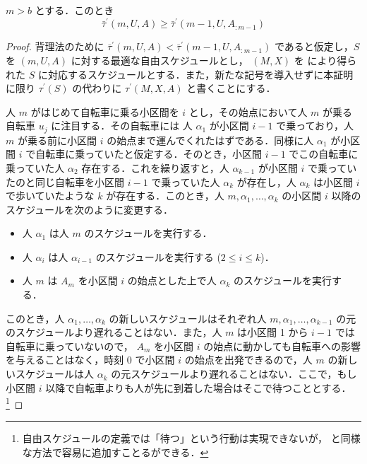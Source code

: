 \begin{lemma}\label{lemma:fsabs-lower-bound-recursive}
  $m > b$ とする．このとき
  \begin{equation}
    \bar\tau^{\prime}(m, U, A) \geq \bar\tau^\prime(m - 1, U, A_{:m-1})
  \end{equation}
\end{lemma}
\begin{proof}
  背理法のために $\bar\tau^{\prime}(m, U, A) < \bar\tau^\prime(m - 1, U, A_{:m-1})$ であると仮定し，$S$ を $(m, U, A)$ に対する最適な自由スケジュールとし， $(M, X)$ を により得られた $S$ に対応するスケジュールとする．また，新たな記号を導入せずに本証明に限り $\tau^\prime(S)$ の代わりに $\tau^\prime(M, X, A)$ と書くことにする．

  人 $m$ がはじめて自転車に乗る小区間を $i$ とし，その始点において人 $m$ が乗る自転車 $u_j$ に注目する．その自転車には 人 $\alpha_1$ が小区間 $i - 1$ で乗っており，人 $m$ が乗る前に小区間 $i$ の始点まで運んでくれたはずである．同様に人 $\alpha_1$ が小区間 $i$ で自転車に乗っていたと仮定する．そのとき，小区間 $i - 1$ でこの自転車に乗っていた人 $\alpha_2$ 存在する．これを繰り返すと，人 $\alpha_{k-1}$ が小区間 $i$ で乗っていたのと同じ自転車を小区間 $i - 1$ で乗っていた人 $\alpha_k$ が存在し，人 $\alpha_k$ は小区間 $i$ で歩いていたような $k$ が存在する．このとき，人 $m,\alpha_1,\ldots,\alpha_k$ の小区間 $i$ 以降のスケジュールを次のように変更する．
  \begin{itemize}
  \item 人 $\alpha_1$ は人 $m$ のスケジュールを実行する．
    \item 人 $\alpha_i$ は人 $\alpha_{i-1}$ のスケジュールを実行する ($2 \leq i \leq k$)．
    \item 人 $m$ は $A_m$ を小区間 $i$ の始点とした上で人 $\alpha_k$ のスケジュールを実行する．
  \end{itemize}
  このとき，人 $\alpha_1,\ldots,\alpha_k$ の新しいスケジュールはそれぞれ人 $m,\alpha_1,\ldots,\alpha_{k-1}$ の元のスケジュールより遅れることはない．また，人 $m$ は小区間 1 から $i - 1$ では自転車に乗っていないので， $A_m$ を小区間 $i$ の始点に動かしても自転車への影響を与えることはなく，時刻 0 で小区間 $i$ の始点を出発できるので，人 $m$ の新しいスケジュールは人 $\alpha_k$ の元スケジュールより遅れることはない．ここで，もし小区間 $i$ 以降で自転車よりも人が先に到着した場合はそこで待つこととする．\footnote{自由スケジュールの定義では「待つ」という行動は実現できないが，  と同様な方法で容易に追加すことるができる．}


\end{proof}
